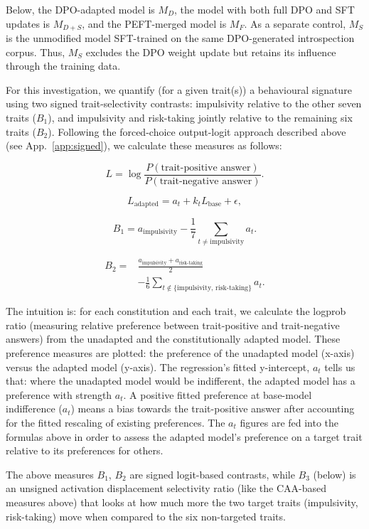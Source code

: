 \documentclass[11pt]{article}
\begin{document}
Below, the DPO-adapted model is $M_D$, the model with both full DPO and SFT updates is $M_{D+S}$, and the PEFT-merged model is $M_F$. As a separate control, $M_S$ is the unmodified model SFT-trained  on the same DPO-generated introspection corpus. Thus, $M_S$ excludes the DPO weight update but retains its influence through the training data.

For this investigation, we quantify (for a given trait(s)) a behavioural signature using two signed trait-selectivity contrasts: impulsivity relative
to the other seven traits ($B_1$), and impulsivity and risk-taking
jointly relative to the remaining six traits ($B_2$).
Following the forced-choice output-logit approach described above
(see App.~\ref{app:signed}), we calculate these measures as follows:

\[
L
=
\log
\frac{P(\text{trait-positive answer})}
     {P(\text{trait-negative answer})}.
\]

\[
L_{\mathrm{adapted}}
=
a_t + k_t L_{\mathrm{base}} + \epsilon,
\]

\[
B_1
=
a_{\mathrm{impulsivity}}
-
\frac{1}{7}
\sum_{t \neq \mathrm{impulsivity}} a_t.
\]

\[
\begin{aligned}
B_2
={}&
\frac{
a_{\mathrm{impulsivity}}
+
a_{\mathrm{risk\text{-}taking}}
}{2}\\
&-
\frac{1}{6}
\sum_{t \notin
\{\mathrm{impulsivity},\,\mathrm{risk\text{-}taking}\}}
a_t.
\end{aligned}
\]

The intuition is: for each constitution and each trait, we calculate the logprob ratio (measuring relative preference between trait-positive and trait-negative answers) from the unadapted and the constitutionally adapted model. These preference measures are plotted: the preference of the unadapted model (x-axis) versus the adapted model (y-axis). The regression's fitted y-intercept, $a_t$ tells us that: where the unadapted model would be indifferent, the adapted model has a preference with strength $a_t$. A positive fitted preference at base-model indifference ($a_t$) means a bias towards the trait-positive answer after accounting for the fitted rescaling of existing preferences. The $a_t$ figures are fed into the formulas above in order to assess the adapted model's preference on a target trait relative to its preferences for others.

The above measures $B_1$, $B_2$ are signed logit-based contrasts, while $B_3$ (below) is an unsigned activation displacement selectivity ratio (like the CAA-based measures above) that looks at how much more the two target traits (impulsivity, risk-taking) move when compared to the six non-targeted traits.
\end{document}
